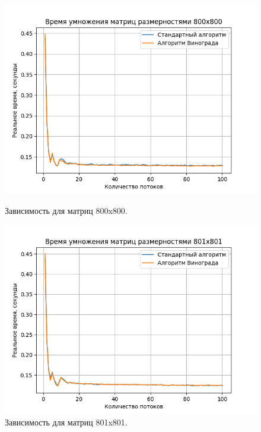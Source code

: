 \documentclass[a4paper,12pt]{article}
\begin{document}
\begin{figure}[H]
\begin{center}
\begin{minipage}[H]{0.48\linewidth}
\includegraphics[width=1\linewidth]{800x800.png}
\caption{Зависимость для матриц 800x800.}
\label{ris:experimoriginal}
\end{minipage}
\hfill
\begin{minipage}[H]{0.48\linewidth}
\includegraphics[width=1\linewidth]{801x801.png}
\caption{Зависимость для матриц 801x801.}
\label{ris:experimcoded}
\end{minipage}
\end{center}
\end{figure}
\end{document}
